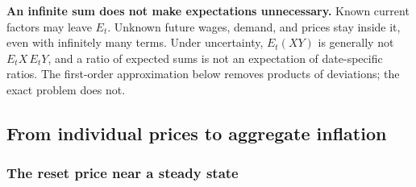 \begin{blueblock}
\textbf{An infinite sum does not make expectations unnecessary.}
Known current factors may leave $E_t$. Unknown future wages, demand, and prices
stay inside it, even with infinitely many terms. Under uncertainty,
$E_t(XY)$ is generally not $E_tX\,E_tY$, and a ratio of expected sums is not an
expectation of date-specific ratios. The first-order approximation below
removes products of deviations; the exact problem does not.
\end{blueblock}

\subsection{From individual prices to aggregate inflation}

\subsubsection{The reset price near a steady state}

